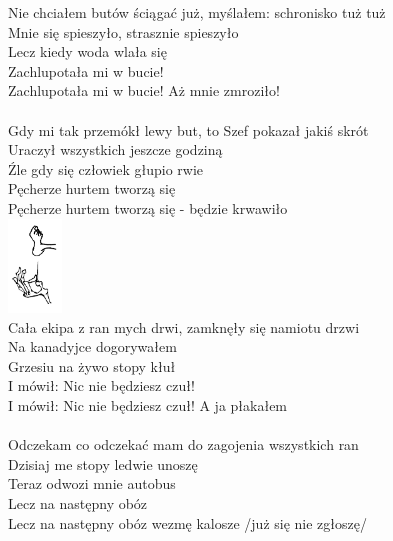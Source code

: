 \documentclass[a5paper, 10pt]{book}
\begin{document}
\begin{minipage}[b]{0.8\textwidth}
  Nie chciałem butów ściągać już, myślałem: schronisko tuż tuż\\
  Mnie się spieszyło, strasznie spieszyło		\\
  \hspace*{5mm}Lecz kiedy woda wlała się				\\
  \hspace*{5mm}Zachlupotała mi w bucie!					\\
  \hspace*{5mm}Zachlupotała mi w bucie! Aż mnie zmroziło!\\
  \\
  Gdy mi tak przemókł lewy but, to Szef pokazał jakiś skrót\\
  Uraczył wszystkich jeszcze godziną\\
  \hspace*{5mm}Źle gdy się człowiek głupio rwie\\
  \hspace*{5mm}Pęcherze hurtem tworzą się\\
  \hspace*{5mm}Pęcherze hurtem tworzą się - będzie krwawiło\\
  \includegraphics[height=2.5cm,right]{images/stopa_dejwa.png}\vspace*{-2.6cm}\\

  Cała ekipa z ran mych drwi, zamknęły się namiotu drzwi\\
  Na kanadyjce dogorywałem\\
  \hspace*{5mm}Grzesiu na żywo stopy kłuł\\
  \hspace*{5mm}I mówił: Nic nie będziesz czuł!\\
  \hspace*{5mm}I mówił: Nic nie będziesz czuł! A ja płakałem\\
  \\
  Odczekam co odczekać mam do zagojenia wszystkich ran\\
  Dzisiaj me stopy ledwie unoszę\\
  \hspace*{5mm}Teraz odwozi mnie autobus\\
  \hspace*{5mm}Lecz na następny obóz\\
  \hspace*{5mm}Lecz na następny obóz wezmę kalosze /już się nie zgłoszę/\\
\end{minipage}
\end{document}
